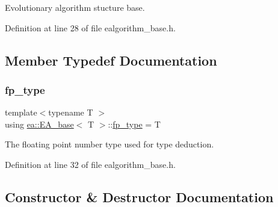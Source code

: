 Evolutionary algorithm stucture base. 

Definition at line 28 of file ealgorithm\+\_\+base.\+h.



\subsection{Member Typedef Documentation}
\mbox{\label{structea_1_1_e_a__base_ab626cb28104f750a38092a742c9fa996}} 
\subsubsection{\texorpdfstring{fp\+\_\+type}{fp\_type}}
{\footnotesize\ttfamily template$<$typename T $>$ \\
using \hyperlink{structea_1_1_e_a__base}{ea\+::\+E\+A\+\_\+base}$<$ T $>$\+::\hyperlink{structea_1_1_e_a__base_ab626cb28104f750a38092a742c9fa996}{fp\+\_\+type} =  T}



The floating point number type used for type deduction. 



Definition at line 32 of file ealgorithm\+\_\+base.\+h.



\subsection{Constructor \& Destructor Documentation}
\mbox{\label{structea_1_1_e_a__base_a4dd8bb67732d28ba3d084ddcd6ee1858}} 
